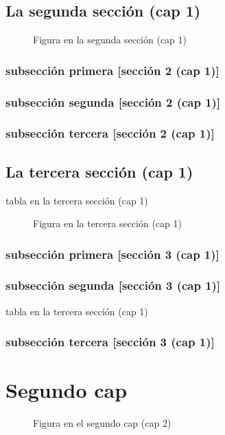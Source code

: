 \documentclass[12pt,a4paper]{report}
\begin{document}
\section{La segunda sección (cap 1)}
\begin{figure}[H]
\caption{Figura en la segunda sección (cap 1)}
\end{figure}
\subsection{subsección primera [sección 2 (cap 1)]}
\subsection{subsección segunda [sección 2 (cap 1)]}
\subsection{subsección tercera [sección 2 (cap 1)]}
\section{La tercera sección (cap 1)}
\begin{table}[H]
\caption{tabla en la tercera sección (cap 1)}
\end{table}
\begin{figure}[H]
\caption{Figura en la tercera sección (cap 1)}
\end{figure}
\subsection{subsección primera [sección 3 (cap 1)]}
\subsection{subsección segunda [sección 3 (cap 1)]}
\begin{table}[H]
\caption{tabla en la tercera sección (cap 1)}
\end{table}
\subsection{subsección tercera [sección 3 (cap 1)]}

\chapter{Segundo cap}
\begin{figure}[H]
\caption{Figura en el segundo cap (cap 2)}
\end{figure}
\end{document}
